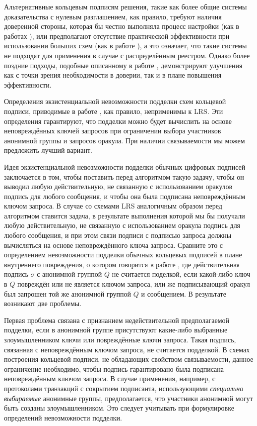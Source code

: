 \documentclass{llncs}
\begin{document}
Альтернативные кольцевым подписям решения, такие как более общие системы доказательства с нулевым разглашением, как правило, требуют наличия доверенной стороны, которая бы честно выполняла процесс настройки (как в работах \cite{groth,ben2014succinct,groth2018updatable}), или предполагают отсутствие практической эффективности при использовании больших схем (как в работе \cite{bulletproofs}), а это означает, что такие системы не подходят для применения в случае с распределённым реестром. Однако более поздние подходы, подобные описанному в работе \cite{hoffmann2019efficient}, демонстрируют улучшения как с точки зрения необходимости в доверии, так и в плане повышения эффективности.

Определения экзистенциальной невозможности подделки схем кольцевой подписи, приводимые в работе \cite{bender2006ring}, как правило, неприменимы к LRS. Эти определения гарантируют, что подделки можно будет вычислить на основе неповреждённых ключей запросов при ограничении выбора участников анонимной группы и запросов оракула. При наличии связываемости мы можем предложить лучший вариант.

Идея экзистенциальной невозможности подделки обычных цифровых подписей заключается в том, чтобы поставить перед алгоритмом такую задачу, чтобы он выводил любую действительную, не связанную с использованием оракулов подпись для любого сообщения, и чтобы она была подписана неповреждённым ключом запроса. В случае со схемами LRS аналогичным образом перед алгоритмом ставится задача, в результате выполнения которой мы бы получали любую действительную, не связанную с использованием оракула подпись для любого сообщения, и при этом связи подписи с подписью запроса должны вычисляться на основе неповреждённого ключа запроса. Сравните это с определением невозможности подделки обычных кольцевых подписей в плане внутреннего повреждения, о котором говорится в работе \cite{bender2006ring}, где действительная подпись $\sigma$ с анонимной группой $Q$ не считается поделкой, если какой-либо ключ в $Q$ повреждён или не является ключом запроса, или же подписывающий оракул был запрошен той же анонимной группой $Q$ и сообщением. В результате возникают две проблемы.

Первая проблема связана с признанием недействительной предполагаемой подделки, если в анонимной группе присутствуют какие-либо выбранные злоумышленником ключи или повреждённые ключи запроса. Такая подпись, связанная с неповреждённым ключом запроса, не считается подделкой. В схемах построения кольцевой подписи, не обладающих свойством связываемости, данное ограничение необходимо, чтобы подпись гарантировано была подписана неповреждённым ключом запроса. В случае применения, например, с протоколами транзакций с сокрытием подписанта, использующими \textit{специально выбираемые} анонимные группы, предполагается, что участники анонимной могут быть созданы злоумышленником. Это следует учитывать при формулировке определений невозможности подделки.
\end{document}
